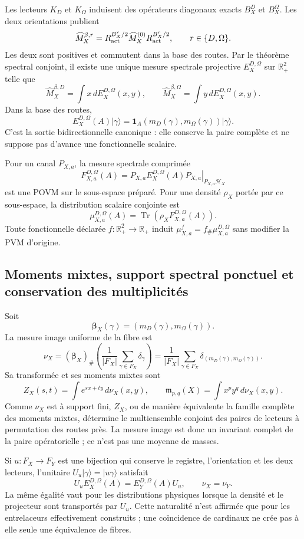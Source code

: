 Les lecteurs \(K_D\) et \(K_\Omega\) induisent des opérateurs diagonaux exacts
\(B_X^D\) et \(B_X^\Omega\). Les deux orientations publient
\[
 \widehat M_X^{\beta,r}
 =R_{\rm act}^{B_X^r/2}\widehat M_X^{(0)}
  R_{\rm act}^{B_X^r/2},
 \qquad r\in\{D,\Omega\}.
\]
Les deux sont positives et commutent dans la base des routes. Par le théorème spectral
conjoint, il existe une unique mesure spectrale projective
\(E_X^{D,\Omega}\) sur \(\mathbb R_+^2\) telle que
\[
 \widehat M_X^{\beta,D}
 =\int x\,dE_X^{D,\Omega}(x,y),
 \qquad
 \widehat M_X^{\beta,\Omega}
 =\int y\,dE_X^{D,\Omega}(x,y).
\]
Dans la base des routes,
\[
 E_X^{D,\Omega}(A)|\gamma\rangle
 =\mathbf 1_A\!\left(m_D(\gamma),m_\Omega(\gamma)\right)
  |\gamma\rangle.
\]
C'est la sortie bidirectionnelle canonique : elle conserve la paire complète et ne
suppose pas d'avance une fonctionnelle scalaire.

Pour un canal \(P_{X,a}\), la mesure spectrale comprimée
\[
 F_{X,a}^{D,\Omega}(A)
 =\left.P_{X,a}E_X^{D,\Omega}(A)P_{X,a}\right|_{P_{X,a}\mathcal H_X}
\]
est une POVM sur le sous-espace préparé. Pour une densité \(\rho_X\)
portée par ce sous-espace, la distribution scalaire conjointe est
\[
 \mu_{X,a}^{D,\Omega}(A)
 =\operatorname{Tr}\!\left(
 \rho_X F_{X,a}^{D,\Omega}(A)
 \right).
\]
Toute fonctionnelle déclarée \(f:\mathbb R_+^2\to\mathbb R_+\) induit
\(\mu_{X,a}^f=f_\#\mu_{X,a}^{D,\Omega}\) sans modifier la PVM d'origine.

\subsection{Moments mixtes, support spectral ponctuel et conservation des multiplicités}

Soit
\[
 \boldsymbol\beta_X(\gamma)
 =(m_D(\gamma),m_\Omega(\gamma)).
\]
La mesure image uniforme de la fibre est
\[
 \nu_X=(\boldsymbol\beta_X)_\#
 \left(\frac1{|F_X|}\sum_{\gamma\in F_X}\delta_\gamma\right)
 =\frac1{|F_X|}\sum_{\gamma\in F_X}
 \delta_{(m_D(\gamma),m_\Omega(\gamma))}.
\]
Sa transformée et ses moments mixtes sont
\[
 Z_X(s,t)=\int e^{sx+ty}\,d\nu_X(x,y),
 \qquad
 \mathfrak m_{p,q}(X)=\int x^py^q\,d\nu_X(x,y).
\]
Comme \(\nu_X\) est à support fini, \(Z_X\), ou de manière équivalente la famille
complète des moments mixtes, détermine le multiensemble conjoint des paires de
lecteurs à permutation des routes près. La mesure image est donc un
invariant complet de la paire opératorielle ; ce n'est pas une moyenne de masses.

Si \(u:F_X\to F_Y\) est une bijection qui conserve le registre, l'orientation et
les deux lecteurs, l'unitaire \(U_u|\gamma\rangle=|u\gamma\rangle\) satisfait
\[
 U_uE_X^{D,\Omega}(A)=E_Y^{D,\Omega}(A)U_u,
 \qquad
 \nu_X=\nu_Y.
\]
La même égalité vaut pour les distributions physiques lorsque la densité et le
projecteur sont transportés par \(U_u\). Cette naturalité n'est affirmée que pour
les entrelaceurs effectivement construits ; une coïncidence de
cardinaux ne crée pas à elle seule une équivalence de fibres.

